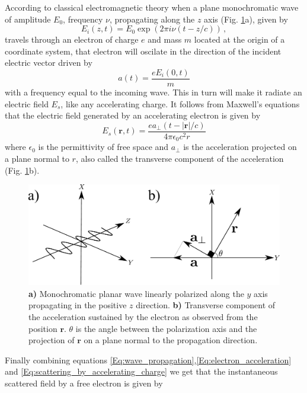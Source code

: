 According to classical electromagnetic theory when a plane monochromatic wave of
amplitude $E_0$, frequency $\nu$, propagating along the $z$ axis
(Fig. \ref{coordinate_axis}a), given by
\begin{equation}
E_i(z,t) = E_0 \exp(2 \pi i \nu (t-z/c)) \, ,
\label{Eq:wave_propagation}
\end{equation}
travels through an electron of charge $e$ and mass $m$ located at the origin of a coordinate
system, that electron will oscilate in the direction of the incident electric 
vector driven by
\begin{equation}
a(t) = \frac{e E_i(0,t)}{m}
\label{Eq:electron_acceleration}
\end{equation}
with a frequency equal to the incoming wave. This in turn will make it radiate
an electric field $E_s$, like any accelerating charge. It follows from Maxwell's
equations that the electric field generated by an accelerating electron is given by
\begin{equation}
E_s( \mathbf r,t) = \frac{e a_{\perp}(t - |\mathbf r|/c)}{4 \pi \epsilon_0 c^2 r}
\label{Eq:scattering_by_accelerating_charge}
\end{equation}
where  $\epsilon_0$ is the permittivity of free space and $a_{\perp}$ is the acceleration projected on a plane normal to $r$, also called the transverse component of the acceleration (Fig. \ref{coordinate_axis}b). 
\begin{figure}[h]
\centering
\includegraphics[width=1 \columnwidth]{Diffraction_Theory/coordinate_acceleration.pdf}
\caption{{\bf a)} Monochromatic planar wave linearly polarized along the $y$ axis
  propagating in the positive $z$ direction. {\bf b)} Transverse component of the
  acceleration sustained by the electron as observed from the position ${\mathbf r}$. $\theta$ is the angle between the polarization axis and the projection of $\mathbf r$ on a plane normal to the propagation direction.}
\label{coordinate_axis}
\end{figure}
Finally combining equations \ref{Eq:wave_propagation},\ref{Eq:electron_acceleration} and \ref{Eq:scattering_by_accelerating_charge} we get that the instantaneous scattered field by a free electron is given by
